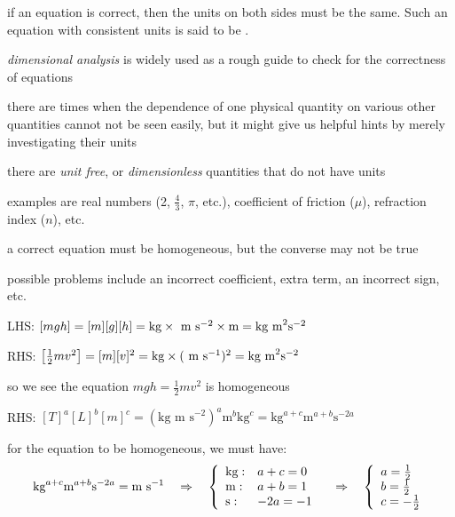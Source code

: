 \begin{ilight}
	if an equation is correct, then the units on both sides must be the same. Such an equation with consistent units is said to be .
\end{ilight}

\emph{dimensional analysis} is widely used as a rough guide to check for the correctness of equations

there are times when the dependence of one physical quantity on various other quantities cannot not be seen easily, but it might give us helpful hints by merely investigating their units

\cmt there are \emph{unit free}, or \emph{dimensionless} quantities that do not have units

examples are real numbers (2, $\frac{4}{3}$, $\pi$, etc.), coefficient of friction ($\mu$), refraction index ($n$), etc.

\cmt a correct equation must be homogeneous, but the converse may not be true

possible problems include an incorrect coefficient, extra term, an incorrect sign, etc.

	
\sol LHS: $[mgh]=[m][g][h] = \text{kg} \times \text{ m s$^{-2}$} \times \text{m} = \text{kg m}^2\text{s}^{-2}$
	
	RHS: $\left[\frac{1}{2}mv^2\right] = [m][v]^2 = \text{kg} \times (\text{ m s$^{-1}$})^2 = \text{kg m}^2\text{s}^{-2}$
	
	so we see the equation $mgh = \frac{1}{2}mv^2$ is homogeneous \eoe
	

\sol RHS: $[T]^a [L]^b [m]^c = (\text{kg m s}^{-2})^a \text{m}^b \text{kg}^c = \text{kg}^{a+c} \text{m}^{a+b} \text{s}^{-2a}$

for the equation to be homogeneous, we must have:
\begin{equation*}
	\text{kg}^{a+c} \text{m}^{a+b} \text{s}^{-2a} = \text{m s}^{-1} \quad \Rightarrow \quad
	\left\{ \begin{array}{ll}
	\text{kg}: & a+c=0 \\
	\text{m}: & a+b=1 \\
	\text{s}: & -2a=-1 \\
	\end{array}\right.
	\quad \Rightarrow \quad \left\{ \begin{array}{l}
	a=\tfrac{1}{2} \\
	b=\tfrac{1}{2} \\
	c=-\tfrac{1}{2} \\
	\end{array}\right.
\end{equation*}

